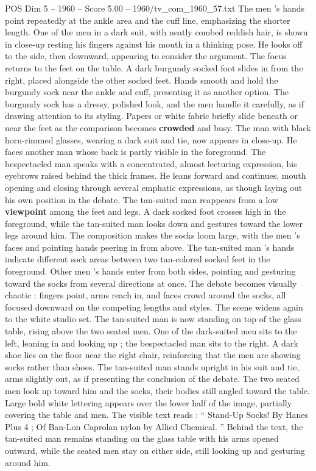 \begin{textsample}{POS Dim 5 – 1960 – Score 5.00 – 1960/tv\_com\_1960\_57.txt}
The men ’s hands point repeatedly at the ankle area and the cuff line, emphasizing the shorter length.
One of the men in a dark suit, with neatly combed reddish hair, is shown in close-up resting his fingers against his mouth in a thinking pose.
He looks off to the side, then downward, appearing to consider the argument.
The focus returns to the feet on the table.
A dark burgundy socked foot slides in from the right, placed alongside the other socked feet.
Hands smooth and hold the burgundy sock near the ankle and cuff, presenting it as another option.
The burgundy sock has a dressy, polished look, and the men handle it carefully, as if drawing attention to its styling.
Papers or white fabric briefly slide beneath or near the feet as the comparison becomes \textbf{crowded} and busy.
The man with black horn-rimmed glasses, wearing a dark suit and tie, now appears in close-up.
He faces another man whose back is partly visible in the foreground.
The bespectacled man speaks with a concentrated, almost lecturing expression, his eyebrows raised behind the thick frames.
He leans forward and continues, mouth opening and closing through several emphatic expressions, as though laying out his own position in the debate.
The tan-suited man reappears from a low \textbf{viewpoint} among the feet and legs.
A dark socked foot crosses high in the foreground, while the tan-suited man looks down and gestures toward the lower legs around him.
The composition makes the socks loom large, with the men ’s faces and pointing hands peering in from above.
The tan-suited man ’s hands indicate different sock areas between two tan-colored socked feet in the foreground.
Other men ’s hands enter from both sides, pointing and gesturing toward the socks from several directions at once.
The debate becomes visually chaotic : fingers point, arms reach in, and faces crowd around the socks, all focused downward on the competing lengths and styles.
The scene widens again to the white studio set.
The tan-suited man is now standing on top of the glass table, rising above the two seated men.
One of the dark-suited men sits to the left, leaning in and looking up ; the bespectacled man sits to the right.
A dark shoe lies on the floor near the right chair, reinforcing that the men are showing socks rather than shoes.
The tan-suited man stands upright in his suit and tie, arms slightly out, as if presenting the conclusion of the debate.
The two seated men look up toward him and the socks, their bodies still angled toward the table.
Large bold white lettering appears over the lower half of the image, partially covering the table and men.
The visible text reads : “ Stand-Up Socks!
By Hanes Plus 4 ; Of Ban-Lon Caprolan nylon by Allied Chemical. ” Behind the text, the tan-suited man remains standing on the glass table with his arms opened outward, while the seated men stay on either side, still looking up and gesturing around him.

\end{textsample}
